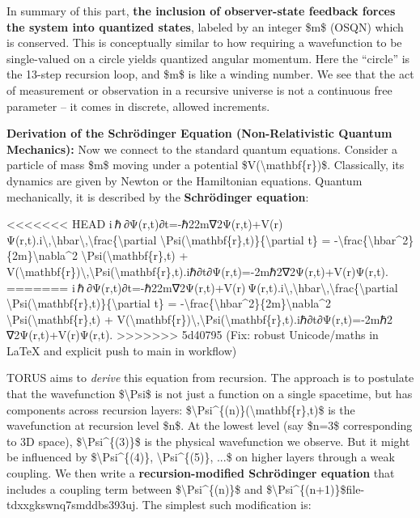 \documentclass[]{article}
\begin{document}
In summary of this part, \textbf{the inclusion of observer-state
feedback forces the system into quantized states}, labeled by an integer
\$m\$ (OSQN) which is conserved. This is conceptually similar to how
requiring a wavefunction to be single-valued on a circle yields
quantized angular momentum. Here the ``circle'' is the 13-step recursion
loop, and \$m\$ is like a winding number​. We see that the act of
measurement or observation in a recursive universe is not a continuous
free parameter -- it comes in discrete, allowed increments.

\textbf{Derivation of the Schrödinger Equation (Non-Relativistic Quantum
Mechanics):} Now we connect to the standard quantum equations. Consider
a particle of mass \$m\$ moving under a potential
\$V(\textbackslash{}mathbf\{r\})\$. Classically, its dynamics are given
by Newton or the Hamiltonian equations. Quantum mechanically, it is
described by the \textbf{Schrödinger equation}:

<<<<<<< HEAD
i ℏ ∂Ψ(r,t)∂t=-ℏ22m∇2Ψ(r,t)+V(r) Ψ(r,t).i\textbackslash,\textbackslash hbar\textbackslash,\textbackslash frac\{\textbackslash partial
\textbackslash Psi(\textbackslash mathbf\{r\},t)\}\{\textbackslash partial
t\} =
-\textbackslash frac\{\textbackslash hbar\^{}2\}\{2m\}\textbackslash nabla\^{}2
\textbackslash Psi(\textbackslash mathbf\{r\},t) +
V(\textbackslash mathbf\{r\})\textbackslash,\textbackslash Psi(\textbackslash mathbf\{r\},t).iℏ∂t∂Ψ(r,t)\hspace{0pt}=-2mℏ2\hspace{0pt}∇2Ψ(r,t)+V(r)Ψ(r,t).
=======
i ℏ ∂Ψ(r,t)∂t=-ℏ22m∇2Ψ(r,t)+V(r) Ψ(r,t).i\textbackslash{},\textbackslash{}hbar\textbackslash{},\textbackslash{}frac\{\textbackslash{}partial
\textbackslash{}Psi(\textbackslash{}mathbf\{r\},t)\}\{\textbackslash{}partial
t\} =
-\textbackslash{}frac\{\textbackslash{}hbar\^{}2\}\{2m\}\textbackslash{}nabla\^{}2
\textbackslash{}Psi(\textbackslash{}mathbf\{r\},t) +
V(\textbackslash{}mathbf\{r\})\textbackslash{},\textbackslash{}Psi(\textbackslash{}mathbf\{r\},t).iℏ∂t∂Ψ(r,t)​=-2mℏ2​∇2Ψ(r,t)+V(r)Ψ(r,t).
>>>>>>> 5d40795 (Fix: robust Unicode/maths in LaTeX and explicit push to main in workflow)

TORUS aims to \emph{derive} this equation from recursion. The approach
is to postulate that the wavefunction \$\textbackslash{}Psi\$ is not
just a function on a single spacetime, but has components across
recursion layers:
\$\textbackslash{}Psi\^{}\{(n)\}(\textbackslash{}mathbf\{r\},t)\$ is the
wavefunction at recursion level \$n\$. At the lowest level (say \$n=3\$
corresponding to 3D space), \$\textbackslash{}Psi\^{}\{(3)\}\$ is the
physical wavefunction we observe. But it might be influenced by
\$\textbackslash{}Psi\^{}\{(4)\}, \textbackslash{}Psi\^{}\{(5)\}, ...\$
on higher layers through a weak coupling. We then write a
\textbf{recursion-modified Schrödinger equation} that includes a
coupling term between \$\textbackslash{}Psi\^{}\{(n)\}\$ and
\$\textbackslash{}Psi\^{}\{(n+1)\}\$​file-tdxxgkswnq7smddbs393uj. The
simplest such modification is:
\end{document}
